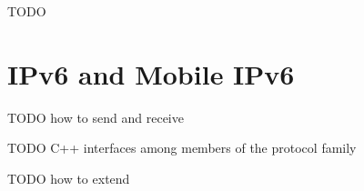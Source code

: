 \ifdraft TODO

\chapter{IPv6 and Mobile IPv6}
\label{cha:ipv6}

TODO how to send and receive

TODO C++ interfaces among members of the protocol family 

TODO how to extend

\fi



